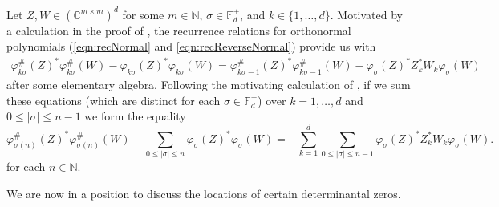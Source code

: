 \documentclass[11pt,reqno]{amsart}
\def\p{\varphi}
\def\s{\sigma}
\def\NN{\mathbb{N}}
\def\CC{\mathbb{C}}
\def\FF{\mathbb{F}}
\theoremstyle{definition}
\numberwithin{equation}{section}
\begin{document}
Let \(Z, W \in (\CC^{m\times m})^d\) for some \(m \in \NN\), \(\s \in \FF_d^+\), and \(k \in \{1, \ldots, d\}\). Motivated by a calculation in the proof of \cite[Theorem 4.2]{CJ02b}, the recurrence relations for orthonormal polynomials (\eqref{eqn:recNormal} and \eqref{eqn:recReverseNormal}) provide us with
\begin{align*}
    \p^\#_{k\s}(Z)^*\p^\#_{k\s}(W) - \p_{k\s}(Z)^*\p_{k\s}(W) = \p_{k\s - 1}^\#(Z)^*\p^\#_{k\s - 1}(W) - \p_\s(Z)^* Z_k^* W_k \p_\s(W)
\end{align*}
after some elementary algebra. Following the motivating calculation of \cite{CJ02b}, if we sum these equations (which are distinct for each \(\s \in \FF_d^+\)) over \(k = 1,\ldots, d\) and \(0 \leq \lvert \s \rvert \leq n-1\) we form the equality
\begin{equation} 
    \label{eqn:SummationFormula}
    \p_{\s(n)}^\#(Z)^* \p_{\s(n)}^\#(W) - \sum_{0 \leq \lvert \s \rvert \leq n} \p_\s(Z)^*\p_\s(W) = - \sum_{k=1}^d \sum_{0 \leq \lvert \s \rvert \leq n-1} \p_\s(Z)^* Z_k^* W_k \p_\s(W).
\end{equation}
for each \(n \in \NN\).

We are now in a position to discuss the locations of certain determinantal zeros.
\end{document}
